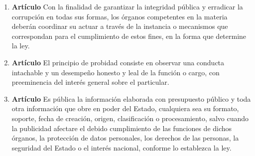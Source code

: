\documentclass[11pt, a4paper]{article}
\begin{document}
\begin{enumerate}
\item \textbf{Artículo} \newline
Con la finalidad de garantizar la integridad pública y erradicar la corrupción en todas sus formas, los órganos competentes en la materia deberán coordinar su actuar a través de la instancia o mecanismos que correspondan para el cumplimiento de estos fines, en la forma que determine la ley. 


\item \textbf{Artículo} \newline
El principio de probidad consiste en observar una conducta intachable y un desempeño honesto y leal de la función o cargo, con preeminencia del interés general sobre el particular. 


\item \textbf{Artículo} \newline
Es pública la información elaborada con presupuesto público y toda otra información que obre en poder del Estado, cualquiera sea su formato, soporte, fecha de creación, origen, clasificación o procesamiento, salvo cuando la publicidad afectare el debido cumplimiento de las funciones de dichos órganos, la protección de datos personales, los derechos de las personas, la seguridad del Estado o el interés nacional, conforme lo establezca la ley. 


\end{enumerate}
\end{document}
